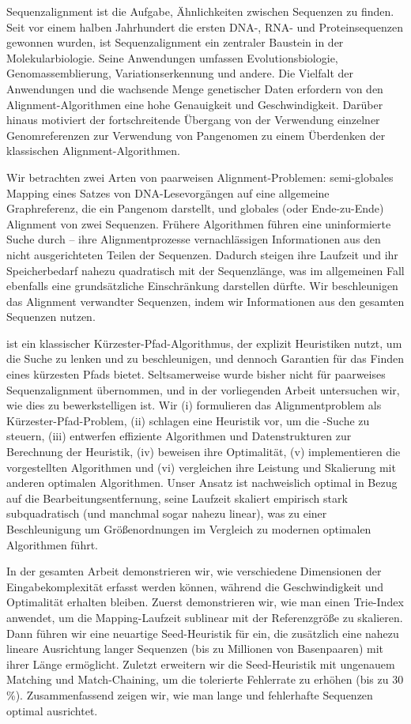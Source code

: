 Sequenzalignment ist die Aufgabe, Ähnlichkeiten zwischen Sequenzen zu finden.
Seit vor einem halben Jahrhundert die ersten DNA-, RNA- und Proteinsequenzen
gewonnen wurden, ist Sequenzalignment ein zentraler Baustein in der
Molekularbiologie. Seine Anwendungen umfassen Evolutionsbiologie,
Genomassemblierung, Variationserkennung und andere. Die Vielfalt der Anwendungen
und die wachsende Menge genetischer Daten erfordern von den
Alignment-Algorithmen eine hohe Genauigkeit und Geschwindigkeit. Darüber hinaus
motiviert der fortschreitende Übergang von der Verwendung einzelner
Genomreferenzen zur Verwendung von Pangenomen zu einem Überdenken der
klassischen Alignment-Algorithmen.

Wir betrachten zwei Arten von paarweisen Alignment-Problemen: semi-globales
Mapping eines Satzes von DNA-Lesevorgängen auf eine allgemeine Graphreferenz,
die ein Pangenom darstellt, und globales (oder Ende-zu-Ende) Alignment von zwei
Sequenzen. Frühere Algorithmen führen eine uninformierte Suche durch – ihre
Alignmentprozesse vernachlässigen Informationen aus den nicht ausgerichteten
Teilen der Sequenzen. Dadurch steigen ihre Laufzeit und ihr Speicherbedarf
nahezu quadratisch mit der Sequenzlänge, was im allgemeinen Fall ebenfalls eine
grundsätzliche Einschränkung darstellen dürfte. Wir beschleunigen das Alignment
verwandter Sequenzen, indem wir Informationen aus den gesamten Sequenzen nutzen.

\A ist ein klassischer Kürzester-Pfad-Algorithmus, der explizit Heuristiken
nutzt, um die Suche zu lenken und zu beschleunigen, und dennoch Garantien für
das Finden eines kürzesten Pfads bietet. Seltsamerweise wurde \A bisher nicht
für paarweises Sequenzalignment übernommen, und in der vorliegenden Arbeit
untersuchen wir, wie dies zu bewerkstelligen ist. Wir (i) formulieren das
Alignmentproblem als Kürzester-Pfad-Problem, (ii) schlagen eine Heuristik vor,
um die \A-Suche zu steuern, (iii) entwerfen effiziente Algorithmen und
Datenstrukturen zur Berechnung der Heuristik, (iv) beweisen ihre Optimalität,
(v) implementieren die vorgestellten Algorithmen und (vi) vergleichen ihre
Leistung und Skalierung mit anderen optimalen Algorithmen. Unser Ansatz ist
nachweislich optimal in Bezug auf die Bearbeitungsentfernung, seine Laufzeit
skaliert empirisch stark subquadratisch (und manchmal sogar nahezu linear), was
zu einer Beschleunigung um Größenordnungen im Vergleich zu modernen optimalen
Algorithmen führt.

In der gesamten Arbeit demonstrieren wir, wie verschiedene Dimensionen der
Eingabekomplexität erfasst werden können, während die Geschwindigkeit und
Optimalität erhalten bleiben. Zuerst demonstrieren wir, wie man einen Trie-Index
anwendet, um die Mapping-Laufzeit sublinear mit der Referenzgröße zu skalieren.
Dann führen wir eine neuartige Seed-Heuristik für \A ein, die zusätzlich eine
nahezu lineare Ausrichtung langer Sequenzen (bis zu Millionen von Basenpaaren)
mit ihrer Länge ermöglicht. Zuletzt erweitern wir die Seed-Heuristik mit
ungenauem Matching und Match-Chaining, um die tolerierte Fehlerrate zu erhöhen
(bis zu 30 \%). Zusammenfassend zeigen wir, wie man lange und fehlerhafte
Sequenzen optimal ausrichtet.

